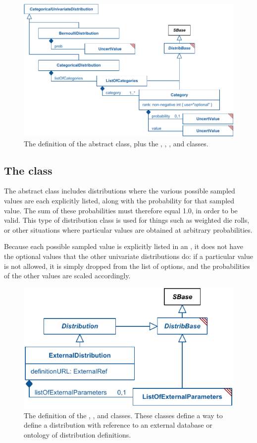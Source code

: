 \begin{figure}[htb]
\includegraphics[width=0.85\linewidth]{figs/categoricalUnivariateDistribution.pdf}
\caption{The definition of the \CategoricalUnivariateDistribution abstract class, plus the \BernoulliDistribution, \CategoricalDistribution, \ListOfCategories, and \Category classes.}
\label{fig:categoricalUnivariateDistribution}
\end{figure}

\subsection{The  class}
\label{CategoricalUnivariateDistribution-class}
\label{categoricalunivariatedistribution-class}

The \CategoricalUnivariateDistribution abstract class includes distributions where the various possible sampled values are each explicitly listed, along with the probability for that sampled value.  The sum of these probabilities must therefore equal 1.0, in order to be valid.  This type of distribution class is used for things such as weighted die rolls, or other situations where particular values are obtained at arbitrary probabilities.

Because each possible sampled value is explicitly listed in an \CategoricalUnivariateDistribution, it does not have the optional \UncertBound values that the other univariate distributions do: if a particular value is not allowed, it is simply dropped from the list of options, and the probabilities of the other values are scaled accordingly.


\begin{figure}[htb]
\includegraphics[width=0.6\linewidth]{figs/externalDistribution.pdf}
\caption{The definition of the \ExternalDistribution, \ExternalParameter, and \ListOfExternalParameters classes.  These classes define a way to define a distribution with reference to an external database or ontology of distribution definitions.}
\label{fig:externalDistribution}
\end{figure}

